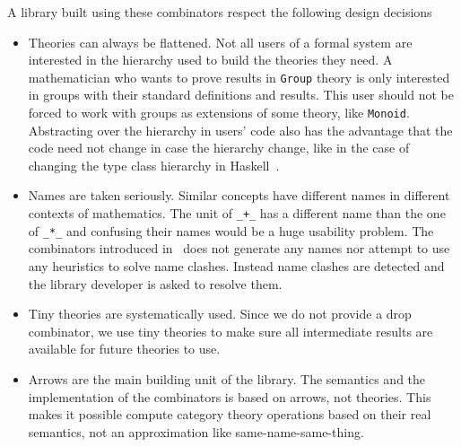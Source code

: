 A library built using these combinators respect the following design decisions 
\begin{itemize}
    \item Theories can always be flattened. Not all users of a formal system are interested in the hierarchy used to build the theories they need. A mathematician who wants to prove results in \verb|Group| theory is only interested in groups with their standard definitions and results. This user should not be forced to work with groups as extensions of some theory, like \verb|Monoid|. Abstracting over the hierarchy in users' code also has the advantage that the code need not change in case the hierarchy change, like in the case of changing the type class hierarchy in Haskell~\cite{wiki:haskell_hierarch}. 
    \item Names are taken seriously. Similar concepts have different names in different contexts of mathematics. The unit of \verb|_+_| has a different name than the one of \verb|_*_| and confusing their names would be a huge usability problem. The combinators introduced in~\cite{carette2018building} does not generate any names nor attempt to use any heuristics to solve name clashes. Instead name clashes are detected and the library developer is asked to resolve them.  
    \item Tiny theories are systematically used. Since we do not provide a drop combinator, we use tiny theories to make sure all intermediate results are available for future theories to use. 
    \item Arrows are the main building unit of the library. The semantics and the implementation of the combinators is based on arrows, not theories. This makes it possible compute category theory operations based on their real semantics, not an approximation like same-name-same-thing. 
\end{itemize}


